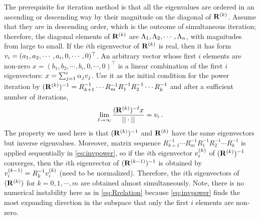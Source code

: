 The prerequisite for iteration method is that all the eigenvalues are
ordered in an ascending or descending way by their magnitude on the
diagonal of $\mathbf{R}^{(k)}$. Assume that they are in descending order, which
is the outcome of simultaneous iteration; therefore, the diagonal elements
of $\mathbf{R}^{(k)}$ are $\Lambda_{1},\Lambda_{2},\cdots,\Lambda_{n}$, with
magnitudes from large to small.
If the $i$th eigenvector of $\mathbf{R}^{(k)}$ is real, then it has form
$v_{i}=(a_{1},a_{2},\allowbreak \cdots,a_{i},0,\cdots, 0)^\top $. An arbitrary
vector whose first $i$ elements are non-zero
$x=(b_{1},b_{2},\cdots,b_{i},0, \allowbreak \cdots, 0)^\top $ is a linear combination
of the first $i$ eigenvectors: $x=\sum_{j=1}^{i}\alpha_{j}v_{j}$.
Use it as the initial condition for the power iteration by
$(\mathbf{R}^{(k)})^{-1}=R_{k+1}^{-1}\cdots R_{m}^{-1}R_{1}^{-1}R_{2}^{-1}\cdots
R_{k}^{-1}$ and after a sufficient number of iterations,
\begin{equation}
  \label{eq:invpower}
  \lim_{\ell\to \infty} \frac{(\mathbf{R}^{(k)})^{-\ell}x}{||\cdot||}=v_{i}
  \,.
\end{equation}
The property we used here is that $(\mathbf{R}^{(k)})^{-1}$ and $\mathbf{R}^{(k)}$ have
the same eigenvectors but inverse eigenvalues.
{Moreover, matrix
  sequence $R_{k+1}^{-1}\cdots R_{m}^{-1}R_{1}^{-1}R_{2}^{-1}\cdots R_{k}^{-1}$
  is applied sequentially in \eqref{eq:invpower},
  so if the $i$th eigenvector $v_{i}^{(k)}$
  of $(\mathbf{R}^{(k)})^{-1}$ converges,
  then the $i$th eigenvector of $(\mathbf{R}^{(k-1)})^{-1}$ is
  obtained by $v_{i}^{(k-1)}=R^{-1}_kv_{i}^{(k)}$ (need to be normalized).
  Therefore, the $i$th eigenvectors
  of $(\mathbf{R}^{(k)})$ for $k=0, 1, \cdots, m$ are obtained almost
  simultaneously. Note, there is no numerical instability here as in
  \eqref{eq:Rrelation} because \eqref{eq:invpower} finds the
  most expanding direction in the subspace that only the first
  $i$ elements are non-zero}.


